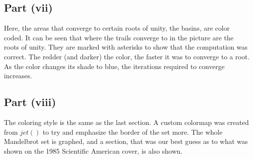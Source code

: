 \documentclass[12pt]{article}
\begin{document}
\subsection*{Part (vii)}
Here, the areas that converge to certain roots of unity, the basins, are color coded.
It can be seen that where the trails converge to in the picture are the roots of unity.
They are marked with asterisks to show that the computation was correct.
The redder (and darker) the color, the faster it was to converge to a root.
As the color changes its shade to blue, the iterations required 
to converge increases.

\subsection*{Part (viii)}
The coloring style is the same as the last section. 
A custom colormap was created from $jet()$ to try and emphasize the border of the set more.
The whole Mandelbrot set is graphed, and a section, that was our best guess as to what was shown on the 1985 Scientific American cover, is also shown.
\end{document}
